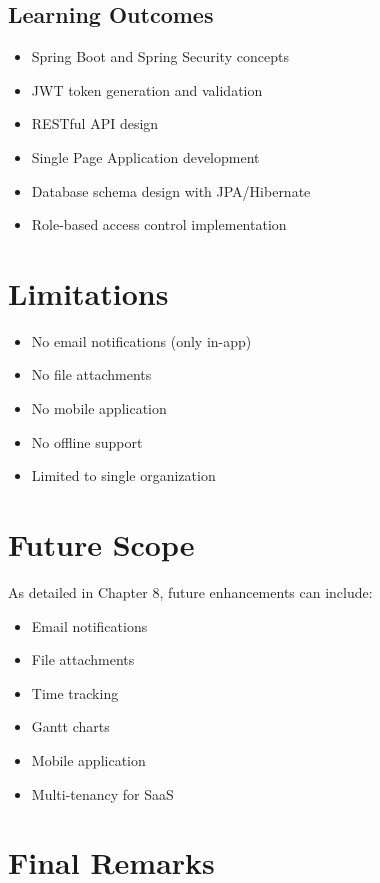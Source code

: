 \documentclass[12pt,a4paper,twoside]{book}
\begin{document}
\subsection{Learning Outcomes}

\begin{itemize}
    \item Spring Boot and Spring Security concepts
    \item JWT token generation and validation
    \item RESTful API design
    \item Single Page Application development
    \item Database schema design with JPA/Hibernate
    \item Role-based access control implementation
\end{itemize}

\section{Limitations}

\begin{itemize}
    \item No email notifications (only in-app)
    \item No file attachments
    \item No mobile application
    \item No offline support
    \item Limited to single organization
\end{itemize}

\section{Future Scope}

As detailed in Chapter 8, future enhancements can include:
\begin{itemize}
    \item Email notifications
    \item File attachments
    \item Time tracking
    \item Gantt charts
    \item Mobile application
    \item Multi-tenancy for SaaS
\end{itemize}

\section{Final Remarks}
\end{document}
